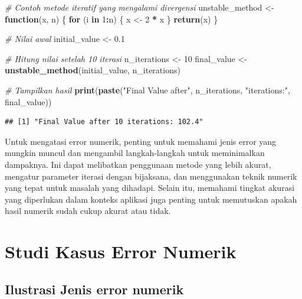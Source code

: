 \documentclass[
]{book}
\newenvironment{Shaded}{\begin{snugshade}}{\end{snugshade}}
\newcommand{\CommentTok}[1]{\textcolor[rgb]{0.56,0.35,0.01}{\textit{#1}}}
\newcommand{\ControlFlowTok}[1]{\textcolor[rgb]{0.13,0.29,0.53}{\textbf{#1}}}
\newcommand{\DecValTok}[1]{\textcolor[rgb]{0.00,0.00,0.81}{#1}}
\newcommand{\FloatTok}[1]{\textcolor[rgb]{0.00,0.00,0.81}{#1}}
\newcommand{\FunctionTok}[1]{\textcolor[rgb]{0.13,0.29,0.53}{\textbf{#1}}}
\newcommand{\NormalTok}[1]{#1}
\newcommand{\OtherTok}[1]{\textcolor[rgb]{0.56,0.35,0.01}{#1}}
\newcommand{\SpecialCharTok}[1]{\textcolor[rgb]{0.81,0.36,0.00}{\textbf{#1}}}
\newcommand{\StringTok}[1]{\textcolor[rgb]{0.31,0.60,0.02}{#1}}
\theoremstyle{definition}
\theoremstyle{definition}
\theoremstyle{definition}
\theoremstyle{definition}
\theoremstyle{remark}
\begin{document}
\begin{Shaded}
\begin{Highlighting}[]
\CommentTok{\# Contoh metode iteratif yang mengalami divergensi}
\NormalTok{unstable\_method }\OtherTok{\textless{}{-}} \ControlFlowTok{function}\NormalTok{(x, n) \{}
  \ControlFlowTok{for}\NormalTok{ (i }\ControlFlowTok{in} \DecValTok{1}\SpecialCharTok{:}\NormalTok{n) \{}
\NormalTok{    x }\OtherTok{\textless{}{-}} \DecValTok{2} \SpecialCharTok{*}\NormalTok{ x}
\NormalTok{  \}}
  \FunctionTok{return}\NormalTok{(x)}
\NormalTok{\}}

\CommentTok{\# Nilai awal}
\NormalTok{initial\_value }\OtherTok{\textless{}{-}} \FloatTok{0.1}

\CommentTok{\# Hitung nilai setelah 10 iterasi}
\NormalTok{n\_iterations }\OtherTok{\textless{}{-}} \DecValTok{10}
\NormalTok{final\_value }\OtherTok{\textless{}{-}} \FunctionTok{unstable\_method}\NormalTok{(initial\_value, n\_iterations)}

\CommentTok{\# Tampilkan hasil}
\FunctionTok{print}\NormalTok{(}\FunctionTok{paste}\NormalTok{(}\StringTok{"Final Value after"}\NormalTok{, n\_iterations, }\StringTok{"iterations:"}\NormalTok{, final\_value))}
\end{Highlighting}
\end{Shaded}

\begin{verbatim}
## [1] "Final Value after 10 iterations: 102.4"
\end{verbatim}

Untuk mengatasi error numerik, penting untuk memahami jenis error yang mungkin muncul dan mengambil langkah-langkah untuk meminimalkan dampaknya. Ini dapat melibatkan penggunaan metode yang lebih akurat, mengatur parameter iterasi dengan bijaksana, dan menggunakan teknik numerik yang tepat untuk masalah yang dihadapi. Selain itu, memahami tingkat akurasi yang diperlukan dalam konteks aplikasi juga penting untuk memutuskan apakah hasil numerik sudah cukup akurat atau tidak.

\hypertarget{studi-kasus-error-numerik}{%
\section{Studi Kasus Error Numerik}\label{studi-kasus-error-numerik}}

\hypertarget{ilustrasi-jenis-error-numerik}{%
\subsection{Ilustrasi Jenis error numerik}\label{ilustrasi-jenis-error-numerik}}
\end{document}
